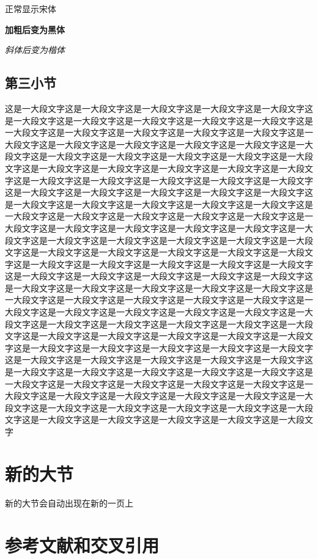\documentclass[supercite]{HustGraduTrans}
\begin{document}
    {正常显示宋体}
    
    {\bfseries 加粗后变为黑体}
    
    {\itshape 斜体后变为楷体}
    
    \subsection{第三小节}
    这是一大段文字这是一大段文字这是一大段文字这是一大段文字这是一大段文字这是一大段文字这是一大段文字这是一大段文字这是一大段文字这是一大段文字这是一大段文字这是一大段文字这是一大段文字这是一大段文字这是一大段文字这是一大段文字这是一大段文字这是一大段文字这是一大段文字这是一大段文字这是一大段文字这是一大段文字这是一大段文字这是一大段文字这是一大段文字这是一大段文字这是一大段文字这是一大段文字这是一大段文字这是一大段文字这是一大段文字这是一大段文字这是一大段文字这是一大段文字这是一大段文字这是一大段文字这是一大段文字这是一大段文字这是一大段文字这是一大段文字这是一大段文字这是一大段文字这是一大段文字这是一大段文字这是一大段文字这是一大段文字这是一大段文字这是一大段文字这是一大段文字这是一大段文字这是一大段文字这是一大段文字这是一大段文字这是一大段文字这是一大段文字这是一大段文字这是一大段文字这是一大段文字这是一大段文字这是一大段文字这是一大段文字这是一大段文字这是一大段文字这是一大段文字这是一大段文字这是一大段文字这是一大段文字这是一大段文字这是一大段文字这是一大段文字这是一大段文字这是一大段文字这是一大段文字这是一大段文字这是一大段文字这是一大段文字这是一大段文字这是一大段文字这是一大段文字这是一大段文字这是一大段文字这是一大段文字这是一大段文字这是一大段文字这是一大段文字这是一大段文字这是一大段文字这是一大段文字这是一大段文字这是一大段文字这是一大段文字这是一大段文字这是一大段文字这是一大段文字这是一大段文字这是一大段文字这是一大段文字这是一大段文字这是一大段文字这是一大段文字这是一大段文字这是一大段文字这是一大段文字这是一大段文字这是一大段文字这是一大段文字这是一大段文字这是一大段文字这是一大段文字这是一大段文字这是一大段文字这是一大段文字这是一大段文字这是一大段文字这是一大段文字这是一大段文字这是一大段文字这是一大段文字这是一大段文字这是一大段文字这是一大段文字这是一大段文字这是一大段文字这是一大段文字这是一大段文字这是一大段文字这是一大段文字这是一大段文字这是一大段文字这是一大段文字这是一大段文字这是一大段文字这是一大段文字这是一大段文字这是一大段文字这是一大段文字这是一大段文字这是一大段文字这是一大段文字
    \section{新的大节}
    新的大节会自动出现在新的一页上
    \section{参考文献和交叉引用}\label{sec:ref}
\end{document}
